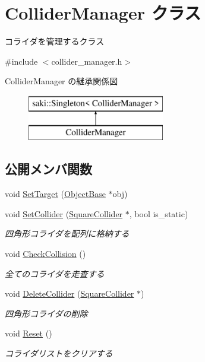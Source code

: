 \hypertarget{class_collider_manager}{}\section{Collider\+Manager クラス}
\label{class_collider_manager}


コライダを管理するクラス  




{\ttfamily \#include $<$collider\+\_\+manager.\+h$>$}

Collider\+Manager の継承関係図\begin{figure}[H]
\begin{center}
\leavevmode
\includegraphics[height=2.000000cm]{class_collider_manager}
\end{center}
\end{figure}
\subsection*{公開メンバ関数}
\begin{DoxyCompactItemize}
\item 
void \mbox{\hyperlink{class_collider_manager_a197aed04295d1118fe7bc0be935b9a47}{Set\+Target}} (\mbox{\hyperlink{class_object_base}{Object\+Base}} $\ast$obj)
\item 
void \mbox{\hyperlink{class_collider_manager_acf6822be802b18cd2f0ea50b2ba00d63}{Set\+Collider}} (\mbox{\hyperlink{class_square_collider}{Square\+Collider}} $\ast$, bool is\+\_\+static)
\begin{DoxyCompactList}\small\item\em 四角形コライダを配列に格納する \end{DoxyCompactList}\item 
void \mbox{\hyperlink{class_collider_manager_af3863143e206b4c86c8b89dd91ff3c8c}{Check\+Collision}} ()
\begin{DoxyCompactList}\small\item\em 全てのコライダを走査する \end{DoxyCompactList}\item 
void \mbox{\hyperlink{class_collider_manager_afb805cdb8c6e5872d54ecbb9368ba38d}{Delete\+Collider}} (\mbox{\hyperlink{class_square_collider}{Square\+Collider}} $\ast$)
\begin{DoxyCompactList}\small\item\em 四角形コライダの削除 \end{DoxyCompactList}\item 
void \mbox{\hyperlink{class_collider_manager_a6d397c24cd8fdac77685d71842b8ae2e}{Reset}} ()
\begin{DoxyCompactList}\small\item\em コライダリストをクリアする \end{DoxyCompactList}\end{DoxyCompactItemize}
